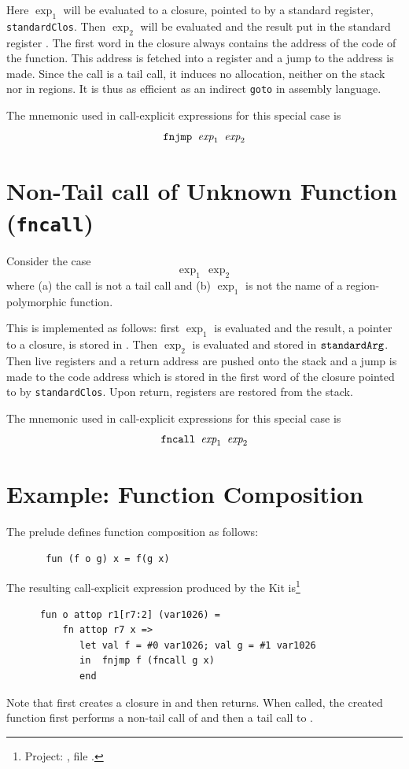 \documentclass[12pt]{book}
\begin{document}
Here $\exp_1$ will be evaluated to a closure, pointed to by a standard 
register, 
{\tt standardClos}. Then $\exp_2$ will be evaluated and the result put
in the standard register .
The first word in the closure always contains the address of
the code of the function. This address is fetched into a register and a jump to
the address is made. Since the call is a tail call, it induces no allocation, neither
on the stack nor in regions. It is thus as efficient as an
indirect {\tt goto} in assembly language.


The mnemonic used in call-explicit expressions for this special case is
$$\hbox{\tt fnjmp $\hbox{\it exp}_1$ $\hbox{\it exp}_2$}$$

\section{Non-Tail call of Unknown Function ({\tt fncall})}
Consider the case
$$\exp_1\,\exp_2$$
where (a) the call is not a tail call and (b) $\exp_1$ is not the name of a region-polymorphic function.

This is implemented as follows: first $\exp_1$ is evaluated and the result, a  pointer to a closure, 
is stored in .
Then $\exp_2$ is evaluated and stored in $\hbox{\tt standardArg}$. Then live registers and a return address
are pushed onto the stack and a jump is made to the code address which is stored in the first word of the closure
pointed to by {\tt standardClos}. Upon return, registers are restored from the stack.

The mnemonic used in call-explicit expressions for this special case is
$$\hbox{\tt fncall $\hbox{\it exp}_1$ $\hbox{\it exp}_2$}$$
\section{Example: Function Composition}
The prelude defines function composition as follows:
\begin{verbatim}
       fun (f o g) x = f(g x)
\end{verbatim}
The resulting call-explicit expression produced by the Kit is\footnote{Project:
, file .}
\begin{verbatim}
      fun o attop r1[r7:2] (var1026) = 
          fn attop r7 x => 
             let val f = #0 var1026; val g = #1 var1026
             in  fnjmp f (fncall g x)
             end 
\end{verbatim}
Note that  first creates a closure in 
and then returns. When called, the created function first performs
a non-tail call of  and then a tail call to .
\end{document}
